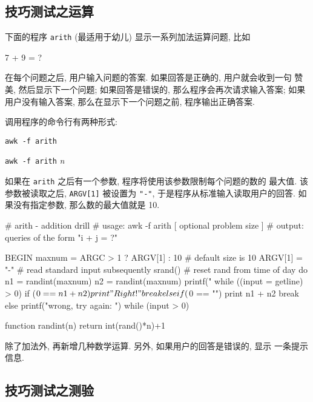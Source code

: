 \subsection{技巧测试之运算}
\label{subsec:skills_testing_arithmetic}

下面的程序 \texttt{arith} (最适用于幼儿) 显示一系列加法运算问题, 比如 
\begin{file}
    7 + 9 = ?
\end{file}
在每个问题之后, 用户输入问题的答案. 如果回答是正确的, 用户就会收到一句
赞美, 然后显示下一个问题; 如果回答是错误的, 那么程序会再次请求输入答案;
如果用户没有输入答案, 那么在显示下一个问题之前, 程序输出正确答案.

调用程序的命令行有两种形式:
\begin{pattern}
    \indent\texttt{awk -f arith} \par 
    \indent\texttt{awk -f arith} \textit{n}
\end{pattern}
如果在 \texttt{arith} 之后有一个参数, 程序将使用该参数限制每个问题的数的
最大值. 该参数被读取之后, \texttt{ARGV[1]} 被设置为 \texttt{"-"},
于是程序从标准输入读取用户的回答. 如果没有指定参数, 那么数的最大值就是
10.
\begin{awkcode}
    # arith - addition drill
    #   usage:  awk -f arith [ optional problem size ]
    #   output: queries of the form "i + j = ?"

    BEGIN {
        maxnum = ARGC > 1 ? ARGV[1] : 10   # default size is 10
        ARGV[1] = "-"  # read standard input subsequently
        srand()        # reset rand from time of day
        do {
            n1 = randint(maxnum)
            n2 = randint(maxnum)
            printf("%
            while ((input = getline) > 0)
                if ($0 == n1 + n2) {
                    print "Right!"
                    break
                } else if ($0 == "") {
                    print n1 + n2
                    break
                } else
                    printf("wrong, try again: ")
        } while (input > 0)
    }

    function randint(n) { return int(rand()*n)+1 }
\end{awkcode}

\begin{exercise}
    除了加法外, 再新增几种数学运算. 另外, 如果用户的回答是错误的, 显示 
    一条提示信息.
\end{exercise}

\subsection{技巧测试之测验}
\label{subsec:skills_testing_quiz}

